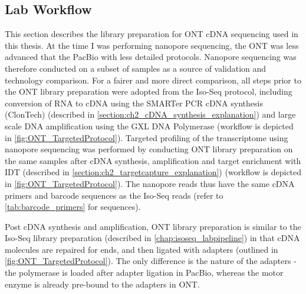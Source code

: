 \clearpage
\subsection{Lab Workflow}
\label{chap:ont_labpipeline}
This section describes the library preparation for ONT cDNA sequencing used in this thesis. At the time I was performing nanopore sequencing, the ONT was less advanced that the PacBio with less detailed protocols. Nanopore sequencing was therefore conducted on a subset of samples as a source of validation and technology comparison. For a fairer and more direct comparison, all steps prior to the ONT library preparation were adopted from the Iso-Seq protocol, including conversion of RNA to cDNA using the SMARTer PCR cDNA synthesis (ClonTech) (described in \cref{section:ch2_cDNA_synthesis_explanation}) and large scale DNA amplification using the GXL DNA Polymerase (workflow is depicted in \cref{fig:ONT_TargetedProtocol}). Targeted profiling of the transcriptome using nanopore sequencing was performed by conducting ONT library preparation on the same samples after cDNA synthesis, amplification and target enrichment with IDT (described in \cref{section:ch2_targetcapture_explanation}) (workflow is depicted in \cref{fig:ONT_TargetedProtocol}). The nanopore reads thus have the same cDNA primers and barcode sequences as the Iso-Seq reads (refer to \cref{tab:barcode_primers} for sequences).   

Post cDNA synthesis and amplification, ONT library preparation is similar to the Iso-Seq library preparation  (described in \cref{chap:isoseq_labpipeline}) in that cDNA molecules are repaired for ends, and then ligated with adapters (outlined in \cref{fig:ONT_TargetedProtocol}). The only difference is the nature of the adapters - the polymerase is loaded after adapter ligation in PacBio, whereas the motor enzyme is already pre-bound to the adapters in ONT. 

